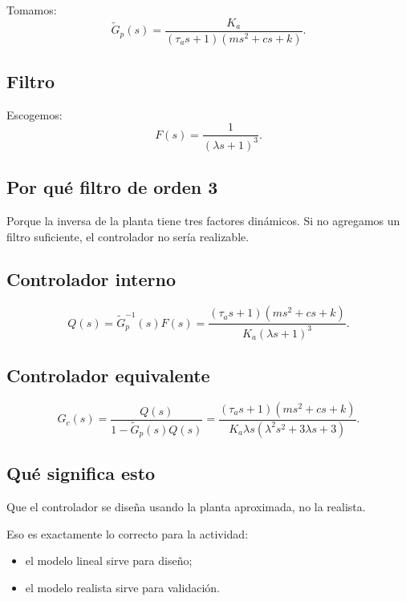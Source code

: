 \documentclass[11pt]{article}
\begin{document}
Tomamos:
\[
\tilde{G}_p(s)=\frac{K_a}{(\tau_as+1)(ms^2+cs+k)}.
\]

\subsection{Filtro}

Escogemos:
\begin{equation}
F(s)=\frac{1}{(\lambda s+1)^3}.
\end{equation}

\subsection{Por qu\'e filtro de orden 3}

Porque la inversa de la planta tiene tres factores din\'amicos. Si no agregamos un filtro suficiente, el controlador no ser\'ia realizable.

\subsection{Controlador interno}

\[
Q(s)=\tilde{G}_p^{-1}(s)F(s)
=
\frac{(\tau_as+1)(ms^2+cs+k)}{K_a(\lambda s+1)^3}.
\]

\subsection{Controlador equivalente}

\begin{equation}
G_c(s)=\frac{Q(s)}{1-\tilde{G}_p(s)Q(s)}
=
\frac{(\tau_as+1)(ms^2+cs+k)}
{K_a\lambda s(\lambda^2s^2+3\lambda s+3)}.
\end{equation}

\subsection{Qu\'e significa esto}

Que el controlador se dise\~na usando la planta aproximada, no la realista.

Eso es exactamente lo correcto para la actividad:

\begin{itemize}[leftmargin=1.2cm]
\item el modelo lineal sirve para dise\~no;
\item el modelo realista sirve para validaci\'on.
\end{itemize}
\end{document}
